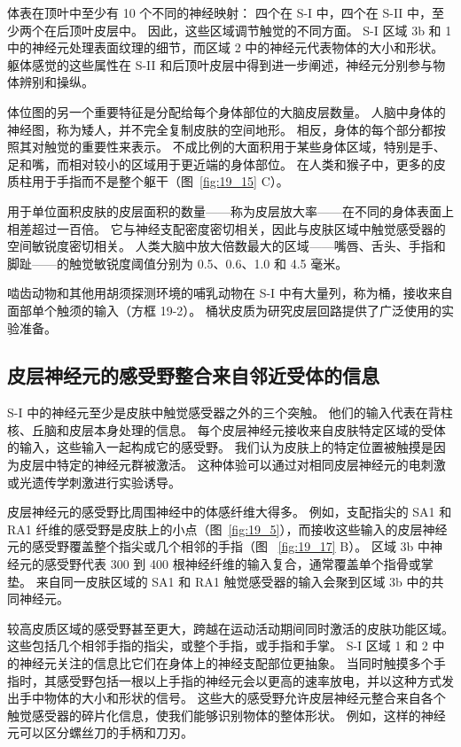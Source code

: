 体表在顶叶中至少有 10 个不同的神经映射：
四个在 S-I 中，四个在 S-II 中，至少两个在后顶叶皮层中。
因此，这些区域调节触觉的不同方面。
S-I 区域 3b 和 1 中的神经元处理表面纹理的细节，而区域 2 中的神经元代表物体的大小和形状。
躯体感觉的这些属性在 S-II 和后顶叶皮层中得到进一步阐述，神经元分别参与物体辨别和操纵。


体位图的另一个重要特征是分配给每个身体部位的大脑皮层数量。
人脑中身体的神经图，称为矮人，并不完全复制皮肤的空间地形。
相反，身体的每个部分都按照其对触觉的重要性来表示。 
不成比例的大面积用于某些身体区域，特别是手、足和嘴，而相对较小的区域用于更近端的身体部位。
在人类和猴子中，更多的皮质柱用于手指而不是整个躯干（图~\ref{fig:19_15} C）。


用于单位面积皮肤的皮层面积的数量——称为皮层放大率——在不同的身体表面上相差超过一百倍。
它与神经支配密度密切相关，因此与皮肤区域中触觉感受器的空间敏锐度密切相关。
人类大脑中放大倍数最大的区域——嘴唇、舌头、手指和脚趾——的触觉敏锐度阈值分别为 0.5、0.6、1.0 和 4.5 毫米。


啮齿动物和其他用胡须探测环境的哺乳动物在 S-I 中有大量列，称为桶，接收来自面部单个触须的输入（方框 19-2）。
桶状皮质为研究皮层回路提供了广泛使用的实验准备。



\subsection{皮层神经元的感受野整合来自邻近受体的信息}

S-I 中的神经元至少是皮肤中触觉感受器之外的三个突触。
他们的输入代表在背柱核、丘脑和皮层本身处理的信息。 
每个皮层神经元接收来自皮肤特定区域的受体的输入，这些输入一起构成它的感受野。
我们认为皮肤上的特定位置被触摸是因为皮层中特定的神经元群被激活。
这种体验可以通过对相同皮层神经元的电刺激或光遗传学刺激进行实验诱导。


皮层神经元的感受野比周围神经中的体感纤维大得多。
例如，支配指尖的 SA1 和 RA1 纤维的感受野是皮肤上的小点（图~\ref{fig:19_5}），而接收这些输入的皮层神经元的感受野覆盖整个指尖或几个相邻的手指（图 ~\ref{fig:19_17} B）。
区域 3b 中神经元的感受野代表 300 到 400 根神经纤维的输入复合，通常覆盖单个指骨或掌垫。
来自同一皮肤区域的 SA1 和 RA1 触觉感受器的输入会聚到区域 3b 中的共同神经元。


较高皮质区域的感受野甚至更大，跨越在运动活动期间同时激活的皮肤功能区域。
这些包括几个相邻手指的指尖，或整个手指，或手指和手掌。
S-I 区域 1 和 2 中的神经元关注的信息比它们在身体上的神经支配部位更抽象。
当同时触摸多个手指时，其感受野包括一根以上手指的神经元会以更高的速率放电，并以这种方式发出手中物体的大小和形状的信号。
这些大的感受野允许皮层神经元整合来自各个触觉感受器的碎片化信息，使我们能够识别物体的整体形状。
例如，这样的神经元可以区分螺丝刀的手柄和刀刃。


